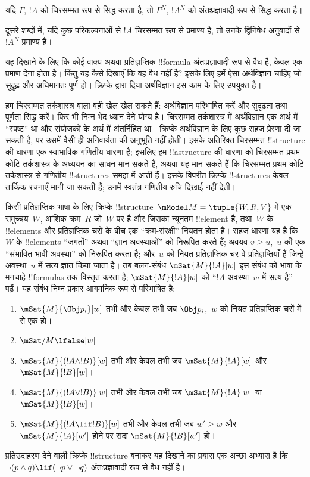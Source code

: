 \documentclass[../../../include/open-logic-section]{subfiles}
\begin{document}
\begin{thm}
यदि $\Gamma$, $!A$ को चिरसम्मत रूप से सिद्ध करता है, तो $\Gamma^N$, $!A^N$
को अंतःप्रज्ञावादी रूप से सिद्ध करता है।
\end{thm}

दूसरे शब्दों में, यदि कुछ परिकल्पनाओं से $!A$ चिरसम्मत रूप से प्रमाण्य है,
तो उनके द्विनिषेध अनुवादों से $!A^N$ प्रमाण्य है।

यह दिखाने के लिए कि कोई वाक्य अथवा प्रतिज्ञप्तिक !!{formula}
अंतःप्रज्ञावादी रूप से वैध है, केवल एक प्रमाण देना होता है। किंतु यह कैसे
दिखाएँ कि वह वैध नहीं है? इसके लिए हमें ऐसा अर्थविज्ञान चाहिए जो सुदृढ़ और
अधिमानतः पूर्ण हो। क्रिप्के द्वारा दिया अर्थविज्ञान इस काम के लिए उपयुक्त
है।

हम चिरसम्मत तर्कशास्त्र वाला वही खेल खेल सकते हैं: अर्थविज्ञान परिभाषित करें
और सुदृढ़ता तथा पूर्णता सिद्ध करें। फिर भी निम्न भेद ध्यान देने योग्य है।
चिरसम्मत तर्कशास्त्र में अर्थविज्ञान एक अर्थ में ``स्पष्ट'' था और संयोजकों
के अर्थ में अंतर्निहित था। क्रिप्के अर्थविज्ञान के लिए कुछ सहज प्रेरणा दी
जा सकती है, पर उसमें वैसी ही अनिवार्यता की अनुभूति नहीं होती। इसके अतिरिक्त
चिरसम्मत !!{structure} की धारणा एक स्वाभाविक गणितीय धारणा है; इसलिए हम
!!a{structure} की धारणा को चिरसम्मत प्रथम-कोटि तर्कशास्त्र के अध्ययन का
साधन मान सकते हैं, अथवा यह मान सकते हैं कि चिरसम्मत प्रथम-कोटि तर्कशास्त्र
से गणितीय !!{structure}s समझ में आती हैं। इसके विपरीत क्रिप्के
!!{structure}s केवल तार्किक रचनाएँ मानी जा सकती हैं; उनमें स्वतंत्र गणितीय रुचि दिखाई नहीं
देती।

किसी प्रतिज्ञप्तिक भाषा के लिए क्रिप्के !!{structure}~$\mModel M = \tuple{W, R, V}$
में एक समुच्चय~$W$, आंशिक क्रम~$R$ जो~$W$ पर है और जिसका न्यूनतम !!{element}
है, तथा~$W$ के !!{element}s और प्रतिज्ञप्तिक चरों के बीच एक ``क्रम-संरक्षी''
नियतन होता है। सहज धारणा यह है कि $W$ के !!{element}s ``जगतों''
अथवा ``ज्ञान-अवस्थाओं'' को निरूपित करते हैं; अवयव $v \geq
u$,~$u$ की एक
``संभावित भावी अवस्था'' को निरूपित करता है; और~$u$ को नियत प्रतिज्ञप्तिक चर
वे प्रतिज्ञप्तियाँ हैं जिन्हें अवस्था~$u$ में सत्य ज्ञात किया जाता है। तब
बलन-संबंध $\mSat{M}{!A}[w]$ इस संबंध को भाषा के मनचाहे !!{formula}s तक
विस्तृत करता है; $\mSat{M}{!A}[w]$ को ``$!A$ अवस्था~$w$ में सत्य है'' पढ़ें।
यह संबंध निम्न प्रकार आगमनिक रूप से परिभाषित है:
\begin{enumerate}
\item $\mSat{M}{\Obj p_i}[w]$ तभी और केवल तभी जब $\Obj p_i$,~$w$ को नियत
  प्रतिज्ञप्तिक चरों में से एक हो।
\item $\mSat/{M}{\lfalse}[w]$।
\item $\mSat{M}{(!A \land !B)}[w]$ तभी और केवल तभी जब $\mSat{M}{!A}[w]$ और
  $\mSat{M}{!B}[w]$।
\item $\mSat{M}{(!A \lor !B)}[w]$ तभी और केवल तभी जब $\mSat{M}{!A}[w]$ या
  $\mSat{M}{!B}[w]$।
\item $\mSat{M}{(!A \lif !B)}[w]$ तभी और केवल तभी जब $w' \geq w$ और
  $\mSat{M}{!A}[w']$ होने पर सदा $\mSat{M}{!B}[w']$ हो।
\end{enumerate}
प्रतिउदाहरण देने वाली क्रिप्के !!{structure} बनाकर यह दिखाने का प्रयास एक
अच्छा अभ्यास है कि $\lnot (p \land q) \lif
(\lnot p \lor \lnot q)$
अंतःप्रज्ञावादी रूप से वैध नहीं है।
\end{document}
